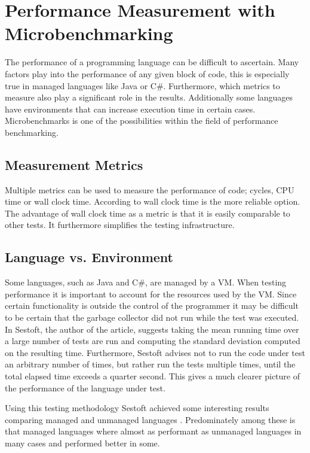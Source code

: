 \section{Performance Measurement with Microbenchmarking} \label{sec:micro-benchmarking}
The performance of a programming language can be difficult to ascertain. Many factors play into the performance of any given block of code, this is especially true in managed languages like Java or C\#. Furthermore, which metrics to measure also play a significant role in the results. Additionally some languages have environments that can increase execution time in certain cases. Microbenchmarks is one of the possibilities within the field of performance benchmarking.

\subsection{Measurement Metrics}
Multiple metrics can be used to measure the performance of code; cycles, \ac{CPU} time or wall clock time. According to \cite{sestoft2013microbenchmarks} wall clock time is the more reliable option. The advantage of wall clock time as a metric is that it is easily comparable to other tests. It furthermore simplifies the testing infrastructure.

\subsection{Language vs. Environment}
Some languages, such as Java and C\#, are managed by a \ac{VM}. When testing performance it is important to account for the resources used by the \ac{VM}. Since certain functionality is outside the control of the programmer it may be difficult to be certain that the garbage collector did not run while the test was executed. In \cite{sestoft2013microbenchmarks} Sestoft, the author of the article, suggests taking the mean running time over a large number of tests are run and computing the standard deviation computed on the resulting time. Furthermore, Sestoft advises not to run the code under test an arbitrary number of times, but rather run the tests multiple times, until the total elapsed time exceeds a quarter second. This gives a much clearer picture of the performance of the language under test.

Using this testing methodology Sestoft achieved some interesting results comparing managed and unmanaged languages \cite{sestoft2010numeric}. Predominately among these is that managed languages where almost as performant as unmanaged languages in many cases and performed better in some.

